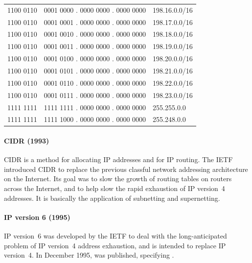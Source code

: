 \begin{center}
\tosfstyle
\begin{tabular}{@{}l@{.}ll@{}}
\textcolor{spot1}{1100 0110} & \textcolor{spot1}{0001 0}\textcolor{spot2}{000} . 0000 0000 . 0000 0000 & 198.16.0.0/16 \\
\textcolor{spot1}{1100 0110} & \textcolor{spot1}{0001 0}\textcolor{spot2}{001} . 0000 0000 . 0000 0000 & 198.17.0.0/16 \\
\textcolor{spot1}{1100 0110} & \textcolor{spot1}{0001 0}\textcolor{spot2}{010} . 0000 0000 . 0000 0000 & 198.18.0.0/16 \\
\textcolor{spot1}{1100 0110} & \textcolor{spot1}{0001 0}\textcolor{spot2}{011} . 0000 0000 . 0000 0000 & 198.19.0.0/16 \\
\textcolor{spot1}{1100 0110} & \textcolor{spot1}{0001 0}\textcolor{spot2}{100} . 0000 0000 . 0000 0000 & 198.20.0.0/16 \\
\textcolor{spot1}{1100 0110} & \textcolor{spot1}{0001 0}\textcolor{spot2}{101} . 0000 0000 . 0000 0000 & 198.21.0.0/16 \\
\textcolor{spot1}{1100 0110} & \textcolor{spot1}{0001 0}\textcolor{spot2}{110} . 0000 0000 . 0000 0000 & 198.22.0.0/16 \\
\textcolor{spot1}{1100 0110} & \textcolor{spot1}{0001 0}\textcolor{spot2}{111} . 0000 0000 . 0000 0000 & 198.23.0.0/16 \\
\midrule
1111 1111 & 1111 1111 . 0000 0000 . 0000 0000 & 255.255.0.0 \\
1111 1111 & 1111 1000 . 0000 0000 . 0000 0000 & 255.248.0.0 \\
\end{tabular}
\end{center}

\paragraph{\acf{CIDR} (1993)}
\Acl{CIDR} is a method for allocating \acs{IP} addresses and for \acs{IP} routing.
The \gls{IETF} introduced \acs{CIDR} to replace the previous classful network addressing architecture on the Internet.
Its goal was to slow the growth of routing tables on routers across the Internet, and to help slow the rapid exhaustion of \acs{IP} version~4 addresses.
It is basically the application of subnetting and supernetting.

\paragraph{\acs{IP} version 6 (1995)}
\acs{IP} version~6 was developed by the \gls{IETF} to deal with the long-anticipated problem of \acs{IP} version~4 address exhaustion, and is intended to replace \acs{IP} version~4.
In December 1995,  was published, specifying \IPsix.

